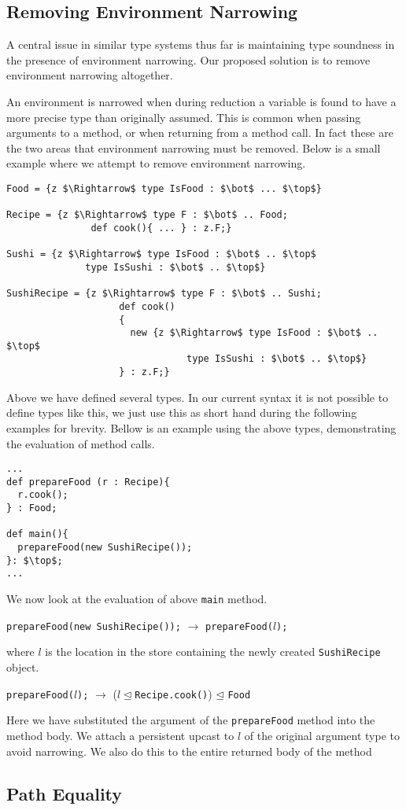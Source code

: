 \documentclass{llncs}
\begin{document}
\subsection{Removing Environment Narrowing}

A central issue in similar type systems thus far is maintaining 
type soundness in the presence of environment narrowing. Our 
proposed solution is to remove environment narrowing altogether.

An environment is narrowed when during reduction a variable is 
found to have a more precise type than originally assumed. This 
is common when passing arguments to a method, or when returning 
from a method call. In fact these are the two areas that environment 
narrowing must be removed. Below is a small example where we attempt to 
remove environment narrowing.
\begin{lstlisting}[mathescape, style=custom_lang]
Food = {z $\Rightarrow$ type IsFood : $\bot$ ... $\top$}

Recipe = {z $\Rightarrow$ type F : $\bot$ .. Food;
               def cook(){ ... } : z.F;}
               
Sushi = {z $\Rightarrow$ type IsFood : $\bot$ .. $\top$
              type IsSushi : $\bot$ .. $\top$}

SushiRecipe = {z $\Rightarrow$ type F : $\bot$ .. Sushi;
                    def cook()
                    {
                      new {z $\Rightarrow$ type IsFood : $\bot$ .. $\top$
                                type IsSushi : $\bot$ .. $\top$}
                    } : z.F;}
\end{lstlisting}
Above we have defined several types. In our current syntax 
it is not possible to define types like this, we just use this 
as short hand during the following examples for brevity. Bellow 
is an example using the above types, demonstrating the evaluation 
of method calls.
\begin{lstlisting}[mathescape, style=custom_lang]
...
def prepareFood (r : Recipe){
  r.cook();
} : Food;

def main(){
  prepareFood(new SushiRecipe());
}: $\top$;
...
\end{lstlisting}
We now look at the evaluation of above \texttt{main} method.
\begin{center}
\texttt{prepareFood(new SushiRecipe());} $\rightarrow$ \texttt{prepareFood($l$);}
\end{center}
where $l$ is the location in 
the store containing the newly created \texttt{SushiRecipe} object.
\begin{center}
\texttt{prepareFood($l$);} $\rightarrow$ ($l\unlhd$\texttt{Recipe.cook()}) 
$\unlhd$ \texttt{Food}
\end{center}
Here we have substituted the argument of the \texttt{prepareFood} method 
into the method body. We attach a persistent upcast to $l$ of the original 
argument type to avoid narrowing. We also do this to the entire returned body 
of the method
\subsection{Path Equality}







\end{document}
